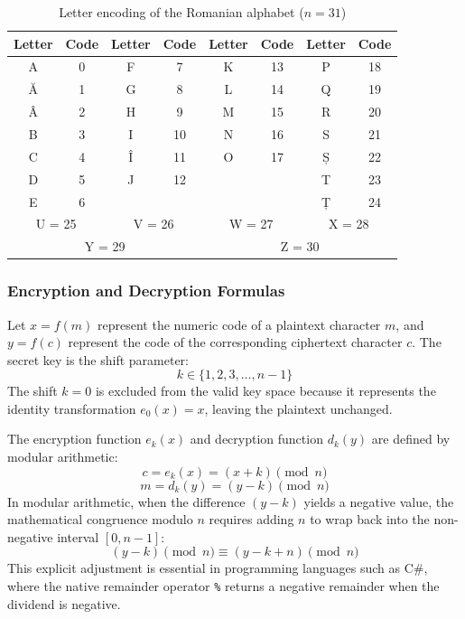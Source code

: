 \documentclass[12pt,a4paper]{article}
\begin{document}
\begin{table}[h!]
\centering
\caption{Letter encoding of the Romanian alphabet ($n = 31$)}
\label{tab:romanian_alphabet}
\small
\begin{tabular}{|c|c||c|c||c|c||c|c|}
\hline
\textbf{Letter} & \textbf{Code} & \textbf{Letter} & \textbf{Code} & \textbf{Letter} & \textbf{Code} & \textbf{Letter} & \textbf{Code} \\
\hline
A  & 0  & F & 7  & K & 13 & P  & 18 \\
Ă  & 1  & G & 8  & L & 14 & Q  & 19 \\
Â  & 2  & H & 9  & M & 15 & R  & 20 \\
B  & 3  & I & 10 & N & 16 & S  & 21 \\
C  & 4  & Î & 11 & O & 17 & Ș  & 22 \\
D  & 5  & J & 12 & \multicolumn{2}{c||}{} & T  & 23 \\
E  & 6  & \multicolumn{2}{c||}{} & \multicolumn{2}{c||}{} & Ț  & 24 \\
\hline
\multicolumn{2}{|c||}{U = 25} & \multicolumn{2}{c||}{V = 26} & \multicolumn{2}{c||}{W = 27} & \multicolumn{2}{c|}{X = 28} \\
\hline
\multicolumn{4}{|c||}{Y = 29} & \multicolumn{4}{c|}{Z = 30} \\
\hline
\end{tabular}
\end{table}

\subsubsection{Encryption and Decryption Formulas}
Let $x = f(m)$ represent the numeric code of a plaintext character $m$, and $y = f(c)$ represent the code of the corresponding ciphertext character $c$. The secret key is the shift parameter:
\begin{equation}
    k \in \{1, 2, 3, \dots, n - 1\}
\end{equation}
The shift $k = 0$ is excluded from the valid key space because it represents the identity transformation $e_0(x) = x$, leaving the plaintext unchanged.

The encryption function $e_k(x)$ and decryption function $d_k(y)$ are defined by modular arithmetic:
\begin{equation}
    \label{eq:caesar_encrypt}
    c = e_k(x) = (x + k) \pmod n
\end{equation}
\begin{equation}
    \label{eq:caesar_decrypt}
    m = d_k(y) = (y - k) \pmod n
\end{equation}
In modular arithmetic, when the difference $(y - k)$ yields a negative value, the mathematical congruence modulo $n$ requires adding $n$ to wrap back into the non-negative interval $[0, n-1]$:
\begin{equation}
    (y - k) \pmod n \equiv (y - k + n) \pmod n
\end{equation}
This explicit adjustment is essential in programming languages such as C\#, where the native remainder operator \texttt{\%} returns a negative remainder when the dividend is negative.
\end{document}
